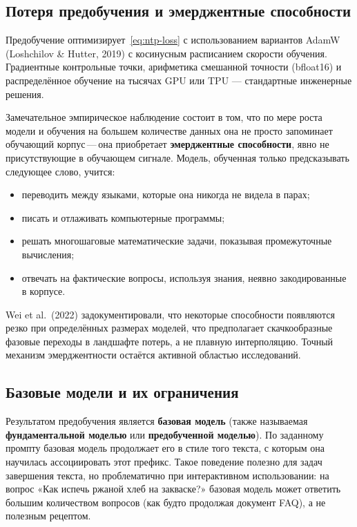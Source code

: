 \subsection{Потеря предобучения и эмерджентные способности}

Предобучение оптимизирует~\eqref{eq:ntp-loss} с использованием вариантов AdamW (Loshchilov \& Hutter, 2019) с косинусным расписанием скорости обучения. Градиентные контрольные точки, арифметика смешанной точности (bfloat16) и распределённое обучение на тысячах GPU или TPU --- стандартные инженерные решения.

Замечательное эмпирическое наблюдение состоит в том, что по мере роста модели и обучения на большем количестве данных она не просто запоминает обучающий корпус\,---\,она приобретает \textbf{эмерджентные способности}, явно не присутствующие в обучающем сигнале. Модель, обученная только предсказывать следующее слово, учится:

\begin{itemize}[leftmargin=*]
  \item переводить между языками, которые она никогда не видела в парах;
  \item писать и отлаживать компьютерные программы;
  \item решать многошаговые математические задачи, показывая промежуточные вычисления;
  \item отвечать на фактические вопросы, используя знания, неявно закодированные в корпусе.
\end{itemize}

Wei et al.\ (2022) задокументировали, что некоторые способности появляются резко при определённых размерах моделей, что предполагает скачкообразные фазовые переходы в ландшафте потерь, а не плавную интерполяцию. Точный механизм эмерджентности остаётся активной областью исследований.

\subsection{Базовые модели и их ограничения}

Результатом предобучения является \textbf{базовая модель} (также называемая \textbf{фундаментальной моделью} или \textbf{предобученной моделью}). По заданному промпту базовая модель продолжает его в стиле того текста, с которым она научилась ассоциировать этот префикс. Такое поведение полезно для задач завершения текста, но проблематично при интерактивном использовании: на вопрос «Как испечь ржаной хлеб на закваске?» базовая модель может ответить большим количеством вопросов (как будто продолжая документ FAQ), а не полезным рецептом.

